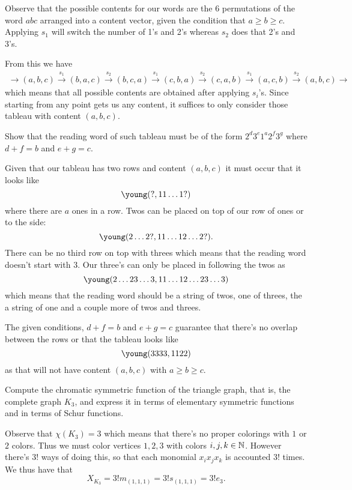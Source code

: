\documentclass[12pt]{memoir}
\begin{document}
\begin{ptcbr}
    Observe that the possible contents for our words are the $6$ permutations of the word $abc$ arranged into a content vector, given the condition that $a\geq b\geq c$. Applying $s_1$ will switch the number of 1's and 2's whereas $s_2$ does that 2's and 3's.\par
    From this we have 
    \begin{align*}
    \to(a,b,c)\xrightarrow{s_1}(b,a,c)\xrightarrow{s_2}(b,c,a)\xrightarrow{s_1}(c,b,a)\xrightarrow{s_2}(c,a,b)\xrightarrow{s_1}(a,c,b)\xrightarrow{s_2}(a,b,c)\to
    \end{align*}
    which means that all possible contents are obtained after applying $s_i$'s. Since starting from any point gets us any content, it suffices to only consider those tableau with content $(a,b,c)$.
\end{ptcbr}

\begin{Ej}[Exercise 1.f]
    Show that the reading word of such tableau must be of the form $2^d3^e1^a2^f3^g$ where $d + f = b$ and $e + g = c$.
\end{Ej}

\begin{ptcbr}
   Given that our tableau has two rows and content $(a,b,c)$ it must occur that it looks like
   $$\young(?,11\dots1?)$$
   where there are $a$ ones in a row. Twos can be placed on top of our row of ones or to the side:
   $$\young(2\dots2?,11\dots12\dots2?).$$
   There can be no third row on top with threes which means that the reading word doesn't start with $3$. Our three's can only be placed in following the twos as
   $$\young(2\dots23\dots3,11\dots12\dots23\dots 3)$$
   which means that the reading word should be a string of twos, one of threes, the a string of one and a couple more of twos and threes.\par
   The given conditions, $d + f = b$ and $e + g = c$ guarantee that there's no overlap between the rows or that the tableau looks like 
   $$\young(3333,1122)$$
   as that will not have content $(a,b,c)$ with $a\geq b\geq c$.

\end{ptcbr}
\begin{Ej}[Exercise 2]
    Compute the chromatic symmetric function of the triangle graph, that is, the complete graph $K_3$, and express it in terms of elementary symmetric functions and in terms of Schur functions.
\end{Ej}

\begin{ptcbr}
Observe that $\chi(K_3)=3$ which means that there's no proper colorings with $1$ or $2$ colors. Thus we must color vertices $1,2,3$ with colors $i,j,k\in\mathbb{N}$. However there's $3!$ ways of doing this, so that each monomial $x_ix_jx_k$ is accounted $3!$ times. We thus have that 
$$X_{K_3}=3!m_{(1,1,1)}=3!s_{(1,1,1)}=3!e_3.$$
\end{ptcbr}
\end{document}
